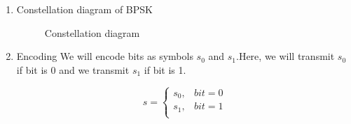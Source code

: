 \begin{enumerate}[label=\thesubsection.\arabic*.,ref=\thesubsection.\theenumi]

\item Constellation diagram of BPSK 
\begin{figure}[!h]
		\resizebox{\columnwidth}{!}{}
\caption{Constellation diagram}
\label{fig:ee18btech11042_1}
\end{figure}
\item Encoding 
\newline 
We will encode bits as  symbols $s_0$ and $s_1$.Here, we will transmit $s_0$ if bit is 0 and we transmit $s_1$ if bit is 1.


\[ s =   \left\{
\begin{array}{cc}

    s_0 ,&     bit = 0 \\
    s_1, &     bit = 1 \\
\end{array}
\right .\]

 




\end{enumerate}
